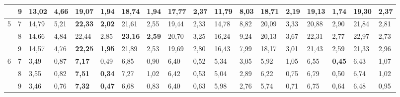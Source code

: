\documentclass[conference]{IEEEtran}
\begin{document}
\begin{table*}[]
\begin{tabular}{|cl|ll|ll|ll|ll|ll|ll|ll|ll|}
		\multicolumn{1}{|c|}{} & 9 & \multicolumn{1}{l|}{13,02} & 4,66 & \multicolumn{1}{l|}{19,07} & 1,94 & \multicolumn{1}{l|}{18,74} & 1,94 & \multicolumn{1}{l|}{17,77} & 2,37 & \multicolumn{1}{l|}{11,79} & 8,03 & \multicolumn{1}{l|}{18,71} & 2,19 & \multicolumn{1}{l|}{19,13} & \textbf{1,74} & \multicolumn{1}{l|}{\textbf{19,30}} & 2,37 \\ \hline
		\multicolumn{1}{|c|}{\multirow{3}{*}{5}} & 7 & \multicolumn{1}{l|}{14,79} & 5,21 & \multicolumn{1}{l|}{\textbf{22,33}} & \textbf{2,02} & \multicolumn{1}{l|}{21,61} & 2,55 & \multicolumn{1}{l|}{19,44} & 2,33 & \multicolumn{1}{l|}{14,78} & 8,82 & \multicolumn{1}{l|}{20,09} & 3,33 & \multicolumn{1}{l|}{20,88} & 2,90 & \multicolumn{1}{l|}{21,84} & 2,81 \\ \cline{2-18} 
		\multicolumn{1}{|c|}{} & 8 & \multicolumn{1}{l|}{14,66} & 4,84 & \multicolumn{1}{l|}{22,44} & 2,85 & \multicolumn{1}{l|}{\textbf{23,16}} & \textbf{2,59} & \multicolumn{1}{l|}{20,70} & 3,25 & \multicolumn{1}{l|}{16,24} & 9,24 & \multicolumn{1}{l|}{20,13} & 3,67 & \multicolumn{1}{l|}{22,31} & 2,77 & \multicolumn{1}{l|}{22,97} & 2,73 \\ \cline{2-18} 
		\multicolumn{1}{|c|}{} & 9 & \multicolumn{1}{l|}{14,57} & 4,76 & \multicolumn{1}{l|}{\textbf{22,25}} & \textbf{1,95} & \multicolumn{1}{l|}{21,89} & 2,53 & \multicolumn{1}{l|}{19,69} & 2,80 & \multicolumn{1}{l|}{16,43} & 7,99 & \multicolumn{1}{l|}{18,17} & 3,01 & \multicolumn{1}{l|}{21,43} & 2,59 & \multicolumn{1}{l|}{21,33} & 2,96 \\ \hline
		\multicolumn{1}{|c|}{\multirow{3}{*}{6}} & 7 & \multicolumn{1}{l|}{3,49} & 0,87 & \multicolumn{1}{l|}{\textbf{7,17}} & 0,49 & \multicolumn{1}{l|}{6,85} & 0,90 & \multicolumn{1}{l|}{6,40} & 0,52 & \multicolumn{1}{l|}{5,34} & 3,05 & \multicolumn{1}{l|}{5,92} & 1,05 & \multicolumn{1}{l|}{6,55} & \textbf{0,45} & \multicolumn{1}{l|}{6,43} & 1,07 \\ \cline{2-18} 
		\multicolumn{1}{|c|}{} & 8 & \multicolumn{1}{l|}{3,55} & 0,82 & \multicolumn{1}{l|}{\textbf{7,51}} & \textbf{0,34} & \multicolumn{1}{l|}{7,27} & 1,02 & \multicolumn{1}{l|}{6,42} & 0,53 & \multicolumn{1}{l|}{5,04} & 2,89 & \multicolumn{1}{l|}{6,22} & 0,75 & \multicolumn{1}{l|}{6,79} & 0,50 & \multicolumn{1}{l|}{6,74} & 1,02 \\ \cline{2-18} 
		\multicolumn{1}{|c|}{} & 9 & \multicolumn{1}{l|}{3,46} & 0,76 & \multicolumn{1}{l|}{\textbf{7,32}} & \textbf{0,47} & \multicolumn{1}{l|}{6,68} & 0,83 & \multicolumn{1}{l|}{6,40} & 0,63 & \multicolumn{1}{l|}{5,98} & 2,76 & \multicolumn{1}{l|}{5,74} & 0,71 & \multicolumn{1}{l|}{6,75} & 0,64 & \multicolumn{1}{l|}{6,48} & 0,95 \\ \hline

\end{tabular}
\end{table*}
\end{document}
